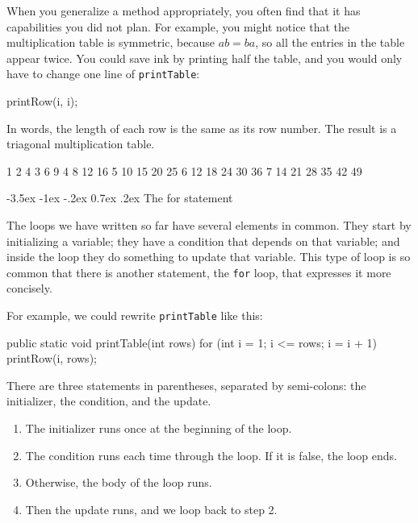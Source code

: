 \documentclass[12pt]{book}
\makeatletter
\theoremstyle{exercise}
\newcommand{\java}[1]{\verb"#1"}
\renewcommand{\section}{\@startsection{section}{1}{\z@}%
    {-3.5ex \@plus -1ex \@minus -.2ex}%
    {0.7ex \@plus.2ex}%
    {\normalfont\Large\bfseries}}
\newcommand{\java}[1]{\lstinline{#1}} %
\makeatother
\begin{document}
When you generalize a method appropriately, you often find that it has capabilities you did not plan.
For example, you might notice that the multiplication table is symmetric, because $ab = ba$, so all the entries in the table appear twice.
You could save ink by printing half the table, and you would only have to change one line of \java{printTable}:

\begin{code}
      printRow(i, i);
\end{code}

In words, the length of each row is the same as its row number.
The result is a triagonal multiplication table.

\begin{stdout}
   1
   2   4
   3   6   9
   4   8  12  16
   5  10  15  20  25
   6  12  18  24  30  36
   7  14  21  28  35  42  49
\end{stdout}



\section{The for statement}
\label{for}


The loops we have written so far have several elements in common.
They start by initializing a variable; they have a condition that depends on that variable; and inside the loop they do something to update that variable.
This type of loop is so common that there is another statement, the \java{for} loop, that expresses it more concisely.

For example, we could rewrite \java{printTable} like this:

\begin{code}
    public static void printTable(int rows) {
        for (int i = 1; i <= rows; i = i + 1) {
            printRow(i, rows);
        }
    }
\end{code}

There are three statements in parentheses, separated by semi-colons: the initializer, the condition, and the update.

\begin{enumerate}

\item The initializer runs once at the beginning of the loop.

\item The condition runs each time through the loop.
If it is false, the loop ends. 

\item Otherwise, the body of the loop runs.

\item Then the update runs, and we loop back to step 2.

\end{enumerate}
\end{document}
